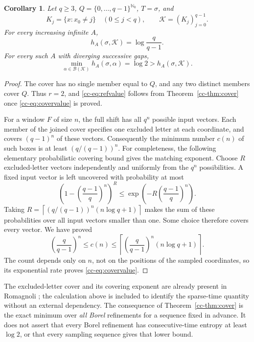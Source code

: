 \documentclass[11pt,reqno]{amsart}
\numberwithin{equation}{section}
\newtheorem{corollary}[theorem]{Corollary}
\theoremstyle{definition}
\newcommand{\Nzero}{\mathbb N_0}
\newcommand{\K}{\mathcal K}
\begin{document}
\begin{corollary}\label{cc-cor:covergap}
Let $q\ge3$, $Q=\{0,\ldots,q-1\}^{\Nzero}$, $T=\sigma$, and
\[
 K_j=\{x:x_0\ne j\}\quad(0\le j<q),\qquad \K=(K_j)_{j=0}^{q-1}.
\]
For every increasing infinite $A$,
\begin{equation}\label{cc-eq:covervalue}
 h_A(\sigma,\K)=\log\frac q{q-1}.
\end{equation}
For every such $A$ with diverging successive gaps,
\begin{equation}\label{cc-eq:refvalue}
 \min_{\alpha\in\mathcal B(\K)}h_A(\sigma,\alpha)=\log2
 >h_A(\sigma,\K).
\end{equation}
\end{corollary}
\begin{proof}
The cover has no single member equal to $Q$, and any two distinct
members cover $Q$. Thus $r=2$, and \eqref{cc-eq:refvalue} follows from
Theorem~\ref{cc-thm:cover} once \eqref{cc-eq:covervalue} is proved.

For a window $F$ of size $n$, the full shift has all $q^n$ possible
input vectors. Each member of the joined cover specifies one excluded
letter at each coordinate, and covers $(q-1)^n$ of these vectors.
Consequently the minimum number $c(n)$ of such boxes is at least
$(q/(q-1))^n$. For completeness, the following elementary probabilistic
covering bound gives the matching exponent. Choose $R$ excluded-letter
vectors independently and uniformly from the $q^n$ possibilities. A
fixed input vector is left uncovered with probability at most
\[
 \left(1-\left(\frac{q-1}{q}\right)^n\right)^R
 \le \exp\left(-R\left(\frac{q-1}{q}\right)^n\right).
\]
Taking
$R=\left\lceil(q/(q-1))^n(n\log q+1)\right\rceil$ makes the sum of
these probabilities over all input vectors smaller than one. Some
choice therefore covers every vector. We have proved
\[
 \left(\frac q{q-1}\right)^n\le c(n)
 \le\left\lceil\left(\frac q{q-1}\right)^n(n\log q+1)\right\rceil.
\]
The count depends only on $n$, not on the positions of the sampled
coordinates, so its exponential rate proves \eqref{cc-eq:covervalue}.
\end{proof}

The excluded-letter cover and its covering exponent are already present
in Romagnoli \cite{Romagnoli2007}; the calculation above is included to
identify the sparse-time quantity without an external dependency.
The consequence of Theorem~\ref{cc-thm:cover} is the exact minimum over
\emph{all Borel} refinements for a sequence fixed in advance. It does not
assert that every Borel refinement has consecutive-time entropy at least
$\log2$, or that every sampling sequence gives that lower bound.
\end{document}
